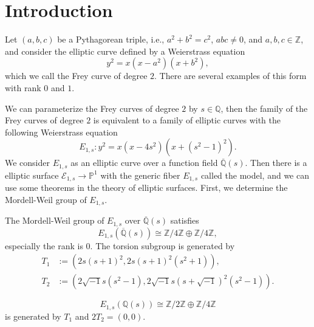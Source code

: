 \documentclass[main]{subfiles}
\begin{document}
\chapter{Introduction}
Let $(a,b,c)$ be a Pythagorean triple, i.e., $a^{2} + b^{2} = c^{2}$, $abc\neq0$, and $a,b,c \in \mathbb{Z}$, and consider the elliptic curve defined by a Weierstrass equation
\begin{equation}
    y^{2} = x(x - a^{2})(x + b^{2}),
\end{equation}
which we call the Frey curve of degree $2$.
There are several examples of this form with rank $0$ and $1$.

We can parameterize the Frey curves of degree $2$ by $s \in \mathbb{Q}$, then the family of the Frey curves of degree $2$ is equivalent to a family of elliptic curves with the following Weierstrass equation
\begin{equation}
    E_{1,s}: y^{2} = x(x - 4s^{2})(x + (s^{2} - 1)^{2}).
\end{equation}
We consider $E_{1,s}$ as an elliptic curve over a function field $\overline{\mathbb{Q}}(s)$.
Then there is a elliptic surface $\mathcal{E}_{1,s} \to \mathbb{P}^{1}$ with the generic fiber $E_{1,s}$ called the \Neron{} model, and we can use some theorems in the theory of elliptic surfaces.
First, we determine the Mordell-Weil group of $E_{1,s}$.

\begin{thm}
    \label{thm:E_{1,s}}
    The Mordell-Weil group of $E_{1,s}$ over $\overline{\mathbb{Q}}(s)$ satisfies
    \begin{equation}
        E_{1,s}(\overline{\mathbb{Q}}(s)) \cong \mathbb{Z} / 4 \mathbb{Z} \oplus \mathbb{Z} / 4 \mathbb{Z},
    \end{equation}
    especially the rank is $0$. The torsion subgroup is generated by
    \begin{align}
        T_1 & := (2s(s+1)^2, 2s(s+1)^2(s^2+1)),                              \\
        T_2 & := (2 \sqrt{-1} s(s^2-1),2 \sqrt{-1} s(s+\sqrt{-1})^2(s^2-1)).
    \end{align}
\end{thm}

\begin{cor}
    \begin{equation}
        E_{1,s}(\mathbb{Q}(s)) \cong \mathbb{Z} / 2 \mathbb{Z} \oplus \mathbb{Z} / 4 \mathbb{Z}
    \end{equation}
    is generated by $T_1$ and $2T_2=(0,0)$.
\end{cor}
\end{document}
